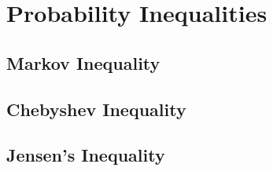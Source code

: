 \section{Probability Inequalities}
\subsection{Markov Inequality}
\subsection{Chebyshev Inequality}
\subsection{Jensen's Inequality}

